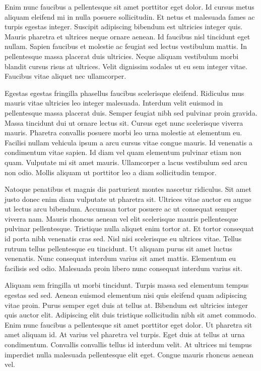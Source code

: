 \documentclass[12pt]{article}
\begin{document}
Enim nunc faucibus a pellentesque sit amet porttitor eget dolor. Id cursus metus aliquam eleifend mi in nulla posuere sollicitudin. Et netus et malesuada fames ac turpis egestas integer. Suscipit adipiscing bibendum est ultricies integer quis. Mauris pharetra et ultrices neque ornare aenean. Id faucibus nisl tincidunt eget nullam. Sapien faucibus et molestie ac feugiat sed lectus vestibulum mattis. In pellentesque massa placerat duis ultricies. Neque aliquam vestibulum morbi blandit cursus risus at ultrices. Velit dignissim sodales ut eu sem integer vitae. Faucibus vitae aliquet nec ullamcorper.

Egestas egestas fringilla phasellus faucibus scelerisque eleifend. Ridiculus mus mauris vitae ultricies leo integer malesuada. Interdum velit euismod in pellentesque massa placerat duis. Semper feugiat nibh sed pulvinar proin gravida. Massa tincidunt dui ut ornare lectus sit. Cursus eget nunc scelerisque viverra mauris. Pharetra convallis posuere morbi leo urna molestie at elementum eu. Facilisi nullam vehicula ipsum a arcu cursus vitae congue mauris. Id venenatis a condimentum vitae sapien. Id diam vel quam elementum pulvinar etiam non quam. Vulputate mi sit amet mauris. Ullamcorper a lacus vestibulum sed arcu non odio. Mollis aliquam ut porttitor leo a diam sollicitudin tempor.

Natoque penatibus et magnis dis parturient montes nascetur ridiculus. Sit amet justo donec enim diam vulputate ut pharetra sit. Ultrices vitae auctor eu augue ut lectus arcu bibendum. Accumsan tortor posuere ac ut consequat semper viverra nam. Mauris rhoncus aenean vel elit scelerisque mauris pellentesque pulvinar pellentesque. Tristique nulla aliquet enim tortor at. Et tortor consequat id porta nibh venenatis cras sed. Nisl nisi scelerisque eu ultrices vitae. Tellus rutrum tellus pellentesque eu tincidunt. Ut aliquam purus sit amet luctus venenatis. Nunc consequat interdum varius sit amet mattis. Elementum eu facilisis sed odio. Malesuada proin libero nunc consequat interdum varius sit.

Aliquam sem fringilla ut morbi tincidunt. Turpis massa sed elementum tempus egestas sed sed. Aenean euismod elementum nisi quis eleifend quam adipiscing vitae proin. Purus semper eget duis at tellus at. Bibendum est ultricies integer quis auctor elit. Adipiscing elit duis tristique sollicitudin nibh sit amet commodo. Enim nunc faucibus a pellentesque sit amet porttitor eget dolor. Ut pharetra sit amet aliquam id. At varius vel pharetra vel turpis. Eget duis at tellus at urna condimentum. Convallis convallis tellus id interdum velit. At ultrices mi tempus imperdiet nulla malesuada pellentesque elit eget. Congue mauris rhoncus aenean vel.
\end{document}
